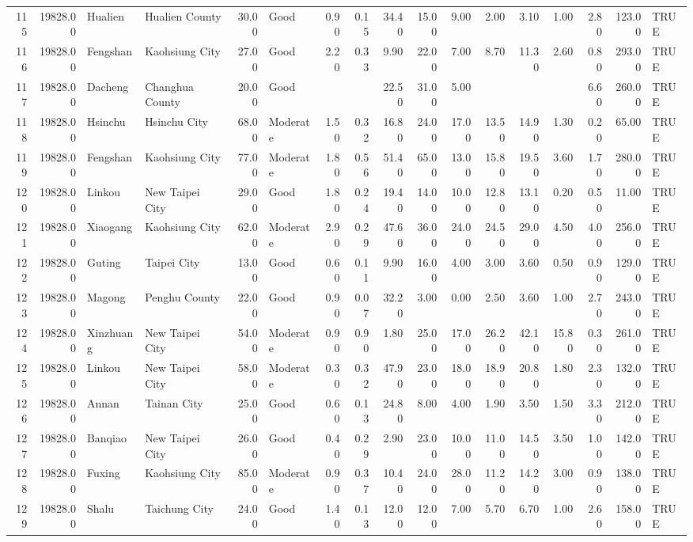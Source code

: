 \begin{table}[ht]
\begin{tabular}{rrllrlrrrrrrrrrrl}
  115 & 19828.00 & Hualien & Hualien County & 30.00 & Good & 0.90 & 0.15 & 34.40 & 15.00 & 9.00 & 2.00 & 3.10 & 1.00 & 2.80 & 123.00 & TRUE \\ 
  116 & 19828.00 & Fengshan & Kaohsiung City & 27.00 & Good & 2.20 & 0.33 & 9.90 & 22.00 & 7.00 & 8.70 & 11.30 & 2.60 & 0.80 & 293.00 & TRUE \\ 
  117 & 19828.00 & Dacheng & Changhua County & 20.00 & Good &  &  & 22.50 & 31.00 & 5.00 &  &  &  & 6.60 & 260.00 & TRUE \\ 
  118 & 19828.00 & Hsinchu & Hsinchu City & 68.00 & Moderate & 1.50 & 0.32 & 16.80 & 24.00 & 17.00 & 13.50 & 14.90 & 1.30 & 0.20 & 65.00 & TRUE \\ 
  119 & 19828.00 & Fengshan & Kaohsiung City & 77.00 & Moderate & 1.80 & 0.56 & 51.40 & 65.00 & 13.00 & 15.80 & 19.50 & 3.60 & 1.70 & 280.00 & TRUE \\ 
  120 & 19828.00 & Linkou & New Taipei City & 29.00 & Good & 1.80 & 0.24 & 19.40 & 14.00 & 10.00 & 12.80 & 13.10 & 0.20 & 0.50 & 11.00 & TRUE \\ 
  121 & 19828.00 & Xiaogang & Kaohsiung City & 62.00 & Moderate & 2.90 & 0.29 & 47.60 & 36.00 & 24.00 & 24.50 & 29.00 & 4.50 & 4.00 & 256.00 & TRUE \\ 
  122 & 19828.00 & Guting & Taipei City & 13.00 & Good & 0.60 & 0.11 & 9.90 & 16.00 & 4.00 & 3.00 & 3.60 & 0.50 & 0.90 & 129.00 & TRUE \\ 
  123 & 19828.00 & Magong & Penghu County & 22.00 & Good & 0.90 & 0.07 & 32.20 & 3.00 & 0.00 & 2.50 & 3.60 & 1.00 & 2.70 & 243.00 & TRUE \\ 
  124 & 19828.00 & Xinzhuang & New Taipei City & 54.00 & Moderate & 0.90 & 0.90 & 1.80 & 25.00 & 17.00 & 26.20 & 42.10 & 15.80 & 0.30 & 261.00 & TRUE \\ 
  125 & 19828.00 & Linkou & New Taipei City & 58.00 & Moderate & 0.30 & 0.32 & 47.90 & 23.00 & 18.00 & 18.90 & 20.80 & 1.80 & 2.30 & 132.00 & TRUE \\ 
  126 & 19828.00 & Annan & Tainan City & 25.00 & Good & 0.60 & 0.13 & 24.80 & 8.00 & 4.00 & 1.90 & 3.50 & 1.50 & 3.30 & 212.00 & TRUE \\ 
  127 & 19828.00 & Banqiao & New Taipei City & 26.00 & Good & 0.40 & 0.29 & 2.90 & 23.00 & 10.00 & 11.00 & 14.50 & 3.50 & 1.00 & 142.00 & TRUE \\ 
  128 & 19828.00 & Fuxing & Kaohsiung City & 85.00 & Moderate & 0.90 & 0.37 & 10.40 & 24.00 & 28.00 & 11.20 & 14.20 & 3.00 & 0.90 & 138.00 & TRUE \\ 
  129 & 19828.00 & Shalu & Taichung City & 24.00 & Good & 1.40 & 0.13 & 12.00 & 12.00 & 7.00 & 5.70 & 6.70 & 1.00 & 2.60 & 158.00 & TRUE \\ 

\end{tabular}
\end{table}
